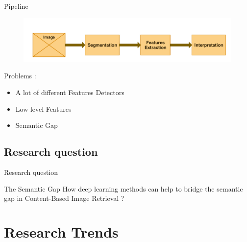 \documentclass{beamer}
\begin{document}
    \begin{frame}{Pipeline}

        \begin{figure}
          \includegraphics[width=1\textwidth]{images/slides/flow.jpg}
        \end{figure}

        \begin{center}
          Problems :
        \end{center}

        \begin{itemize}
          \centering
          \item A lot of different Features Detectors
          \item Low level Features
          \item Semantic Gap
        \end{itemize}

    \end{frame}

  \subsection{Research question}
    \begin{frame}{Research question}

      \begin{block}{The Semantic Gap}
        How deep learning methods can help to bridge the semantic gap in Content-Based Image Retrieval ?
      \end{block}

    \end{frame}

  \section{Research Trends}

\end{document}
